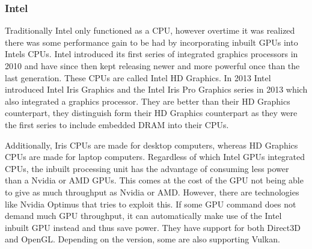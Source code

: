 \subsubsection{Intel}
Traditionally Intel only functioned as a \gls{CPU}, however overtime it was realized there was some performance gain to be had by incorporating inbuilt \glspl{GPU} into Intels \glspl{CPU}.
Intel introduced its first series of integrated graphics processors in 2010 and have since then kept releasing newer and more powerful once than the last generation. 
These \glspl{CPU} are called Intel HD Graphics. 
In 2013 Intel introduced Intel Iris Graphics and the Intel Iris Pro Graphics series in 2013 which also integrated a graphics processor. 
They are better than their HD Graphics counterpart, they distinguish form their HD Graphics counterpart as they were the first series to include embedded DRAM into their \glspl{CPU}. 

Additionally, Iris \glspl{CPU} are made for desktop computers, whereas HD Graphics \glspl{CPU} are made for laptop computers.
Regardless of which Intel \glspl{GPU} integrated \glspl{CPU}, the inbuilt processing unit has the advantage of consuming less power than a Nvidia or AMD \glspl{GPU}.
This comes at the cost of the \gls{GPU} not being able to give as much throughput as Nvidia or AMD. 
However, there are technologies like Nvidia Optimus that tries to exploit this. 
If some GPU command does not demand much \gls{GPU} throughput, it can automatically make use of the Intel inbuilt \gls{GPU} instead and thus save power.
They have support for both Direct3D and OpenGL. Depending on the version, some are also supporting Vulkan.


